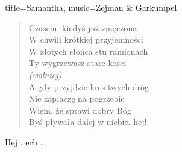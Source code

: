 \begin{song}{title={Samantha}, music={Zejman \& Garkumpel}}
\begin{multicols}{2}
    \begin{verse}
        Czasem, kiedyś już zmęczona \\
        W chwili krótkiej przyjemności \\
        W złotych słońca stu ramionach \\
        Ty wygrzewasz stare kości \medskip \\
        \textit{(wolniej)} \\
        A gdy przyjdzie kres twych dróg \\
        Nie zapłaczę na pogrzebie \\
        Wiem, że sprawi dobry Bóg \\
        Byś pływała dalej w niebie, hej!
    \end{verse}
    \begin{chorus}
        Hej , ech \ldots
    \end{chorus}
    \end{multicols}
\end{song}

